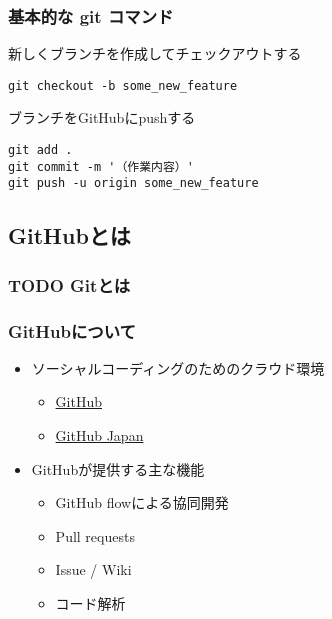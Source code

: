 \documentclass[a4paper,twoside,twocolumn]{bxjsarticle}
\begin{document}
\subsubsection{基本的な git コマンド}
\label{sec-2-1-1}
新しくブランチを作成してチェックアウトする

\begin{verbatim}
git checkout -b some_new_feature
\end{verbatim}

ブランチをGitHubにpushする

\begin{verbatim}
git add .
git commit -m '（作業内容）'
git push -u origin some_new_feature
\end{verbatim}


\subsection{GitHubとは}
\label{sec-2-2}
\subsubsection{{\bfseries\sffamily TODO} Gitとは}
\label{sec-2-2-1}
\subsubsection{GitHubについて}
\label{sec-2-2-2}
\begin{itemize}
\item ソーシャルコーディングのためのクラウド環境
\begin{itemize}
\item \href{https://github.com/}{GitHub}
\item \href{http://github.co.jp/}{GitHub Japan}
\end{itemize}
\item GitHubが提供する主な機能
\begin{itemize}
\item GitHub flowによる協同開発
\item Pull requests
\item Issue / Wiki
\item コード解析
\end{itemize}
\end{itemize}
\end{document}
